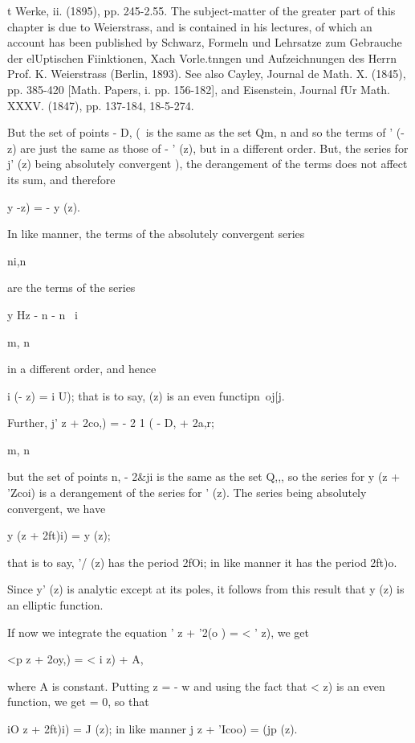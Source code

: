 {t Werke, ii. (1895), pp. 245-2.55. The subject-matter of the greater
part of this chapter is due to Weierstrass, and is contained in his
lectures, of which an account has been published by Schwarz, Formeln
und Lehrsatze zum Gebrauche der elUptischen Fiinktionen, Xach
Vorle.tnngen und Aufzeichnungen des Herrn Prof. K. Weierstrass
(Berlin, 1893). See also Cayley, Journal de Math. X. (1845), pp.
385-420 [Math. Papers, i. pp. 156-182], and Eisenstein, Journal fUr
Math. XXXV. (1847), pp. 137-184, 18-5-274.

%
%

But the set of points - D, (\ is the same as the set Qm, n and so the
terms of ' (- z) are just the same as those of - ' (z), but in a
different order. But, the series for j' (z) being absolutely
convergent ), the derangement of the terms does not affect its
sum, and therefore

 y -z) = - y (z).

In like manner, the terms of the absolutely convergent series

ni,n

are the terms of the series

y Hz - n - n~ i

m, n

in a different order, and hence

i (- z) = i U); that is to say, (z) is an even functipn\ oj[j.

Further, j' z + 2co,) = - 2 1 ( - D, + 2a,r;

m, n

but the set of points n, - 2\&ji is the same as the set Q,,, so the
series for y (z + 'Zcoi) is a derangement of the series for ' (z). The
series being absolutely convergent, we have

 y (z + 2ft)i) = y (z);

that is to say, '/ (z) has the period 2fOi; in like manner it has the
period 2ft)o.

Since y' (z) is analytic except at its poles, it follows from this
result that y (z) is an elliptic function.

If now we integrate the equation ' z + '2(o ) = < ' z), we get

<p z + 2oy,) = < i z) + A,

where A is constant. Putting z = - w and using the fact that < z) is
an even function, we get = 0, so that

iO z + 2ft)i) = J (z); in like manner j z + 'Icoo) = (jp (z).

}
